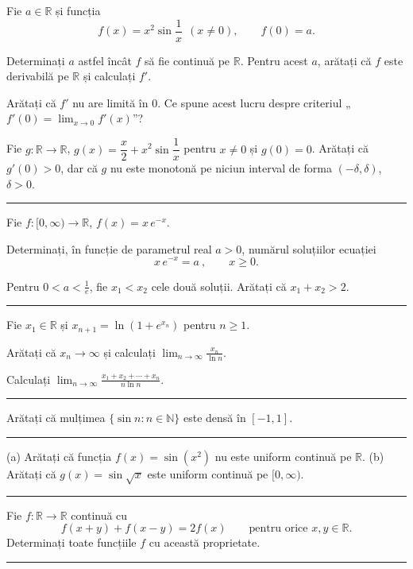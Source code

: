Fie $a\in\mathbb{R}$ și funcția
\[ f(x)=x^{2}\sin\frac{1}{x}\ \ (x\neq0),\qquad f(0)=a . \]
\begin{parti}
  \item Determinați $a$ astfel încât $f$ să fie continuă pe $\mathbb{R}$. Pentru acest $a$, arătați că $f$ este derivabilă pe $\mathbb{R}$ și calculați $f'$.
  \item Arătați că $f'$ nu are limită în $0$. Ce spune acest lucru despre criteriul „$f'(0)=\lim_{x\to0}f'(x)$''?
  \item Fie $g:\mathbb{R}\to\mathbb{R}$, $g(x)=\dfrac x2+x^{2}\sin\dfrac1x$ pentru $x\neq0$ și $g(0)=0$. Arătați că $g'(0)>0$, dar că $g$ nu este monotonă pe niciun interval de forma $(-\delta,\delta)$, $\delta>0$.
\end{parti}
\vspace{1mm}\hrule

Fie $f:[0,\infty)\to\mathbb{R}$, $f(x)=x\,e^{-x}$.
\begin{parti}
  \item Determinați, în funcție de parametrul real $a>0$, numărul soluțiilor ecuației
  \[ x\,e^{-x}=a\ ,\qquad x\ge0 . \]
  \item Pentru $0<a<\frac1e$, fie $x_1<x_2$ cele două soluții. Arătați că $x_1+x_2>2$.
\end{parti}
\vspace{1mm}\hrule

Fie $x_1\in\mathbb{R}$ și $x_{n+1}=\ln\!\left(1+e^{x_n}\right)$ pentru $n\ge1$.
\begin{parti}
  \item Arătați că $x_n\to\infty$ și calculați $\displaystyle\lim_{n\to\infty}\frac{x_n}{\ln n}$.
  \item Calculați $\displaystyle\lim_{n\to\infty}\frac{x_1+x_2+\cdots+x_n}{n\ln n}$.
\end{parti}
\vspace{1mm}\hrule

Arătați că mulțimea $\{\sin n : n\in\mathbb{N}\}$ este densă în $[-1,1]$.
\vspace{1mm}\hrule

(a) Arătați că funcția $f(x)=\sin(x^2)$ nu este uniform continuă pe $\mathbb{R}$.
(b) Arătați că $g(x)=\sin\sqrt{x}$ este uniform continuă pe $[0,\infty)$.
\vspace{1mm}\hrule

Fie $f:\mathbb{R}\to\mathbb{R}$ continuă cu
\[ f(x+y)+f(x-y)=2f(x)\qquad\text{pentru orice }x,y\in\mathbb{R}. \]
Determinați toate funcțiile $f$ cu această proprietate.
\vspace{1mm}\hrule

